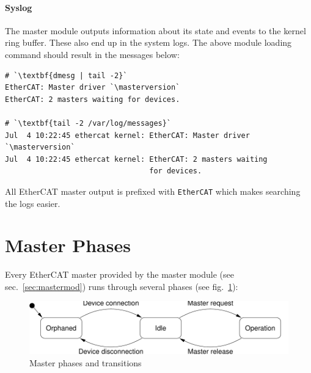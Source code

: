\documentclass[a4paper,12pt,BCOR6mm,bibtotoc,idxtotoc]{scrbook}
\newcommand{\masterversion}{1.5.0}
\begin{document}
\paragraph{Syslog}

The master module outputs information about its state and events to the kernel
ring buffer. These also end up in the system logs.  The above module loading
command should result in the messages below:

\begin{lstlisting}
# `\textbf{dmesg | tail -2}`
EtherCAT: Master driver `\masterversion`
EtherCAT: 2 masters waiting for devices.

# `\textbf{tail -2 /var/log/messages}`
Jul  4 10:22:45 ethercat kernel: EtherCAT: Master driver `\masterversion`
Jul  4 10:22:45 ethercat kernel: EtherCAT: 2 masters waiting
                                 for devices.
\end{lstlisting}

All EtherCAT master output is prefixed with \lstinline+EtherCAT+ which makes
searching the logs easier.


\section{Master Phases}

Every EtherCAT master provided by the master module (see
sec.~\ref{sec:mastermod}) runs through several phases (see
fig.~\ref{fig:phases}):

\begin{figure}[htbp]
  \centering
  \includegraphics[width=.9\textwidth]{images/phases}
  \caption{Master phases and transitions}
  \label{fig:phases}
\end{figure}
\end{document}
